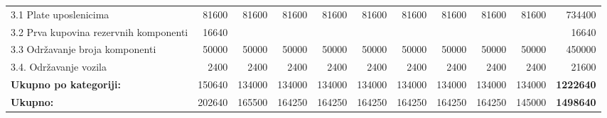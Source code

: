 \documentclass[12pt]{article}
\begin{document}
\begin{landscape}
\begin{table}[htbp]
\begin{tabular}{lrrrrrrrrrr}
    3.1 Plate uposlenicima & 81600 & 81600 & 81600 & 81600 & 81600 & 81600 & 81600 & 81600 & 81600 & 734400 \\
    \multicolumn{1}{p{14.715em}}{3.2 Prva kupovina rezervnih\newline{} komponenti} & 16640 &       &       &       &       &       &       &       &       & 16640 \\
    3.3 Održavanje broja komponenti & 50000 & 50000 & 50000 & 50000 & 50000 & 50000 & 50000 & 50000 & 50000 & 450000 \\
    3.4. Održavanje vozila & 2400  & 2400  & 2400  & 2400  & 2400  & 2400  & 2400  & 2400  & 2400  & 21600 \\
    \midrule
    \textbf{Ukupno po kategoriji:} & 150640 & 134000 & 134000 & 134000 & 134000 & 134000 & 134000 & 134000 & 134000 & \textbf{1222640} \\
    \midrule
    \textbf{Ukupno:} & 202640 & 165500 & 164250 & 164250 & 164250 & 164250 & 164250 & 164250 & 145000 & \textbf{1498640} \\
    \bottomrule
    \end{tabular}%
  \label{tab:addlabel}%
\end{table}%

\end{landscape}
\end{document}
